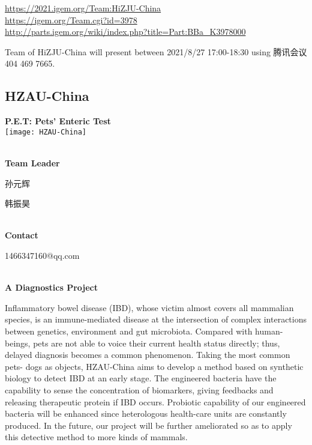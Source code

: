 \url{https://2021.igem.org/Team:HiZJU-China }\\
\url{https://igem.org/Team.cgi?id=3978 }\\
\url{http://parts.igem.org/wiki/index.php?title=Part:BBa_K3978000 }\\


\vfill{}









Team of HiZJU-China will present between   2021/8/27 17:00-18:30      using 腾讯会议 404 469 7665.
\newpage


\subsection{\textcolor{Blu}{ HZAU-China } }
\vspace{5mm}
\begin{center}
\large{
  \textbf{ P.E.T: Pets’ Enteric Test }\\

  \texttt{[image: HZAU-China]}
}
\end{center}
\textbf{\\Team Leader}

  孙元辉

  韩振昊


\textbf{\\Contact}

  1466347160@qq.com


\textbf{\\A Diagnostics Project\\}\begin{spacing}{1.5}

Inflammatory bowel disease (IBD), whose victim almost covers all mammalian species, is an immune-mediated disease at the intersection of complex interactions between genetics, environment and gut microbiota. Compared with human-beings, pets are not able to voice their current health status directly; thus, delayed diagnosis becomes a common phenomenon. Taking the most common pets- dogs as objects, HZAU-China aims to develop a method based on synthetic biology to detect IBD at an early stage. The engineered bacteria have the capability to sense the concentration of biomarkers, giving feedbacks and releasing therapeutic protein if IBD occurs. Probiotic capability of our engineered bacteria will be enhanced since heterologous health-care units are constantly produced. In the future, our project will be further ameliorated so as to apply this detective method to more kinds of mammals.\end{spacing}
\\

